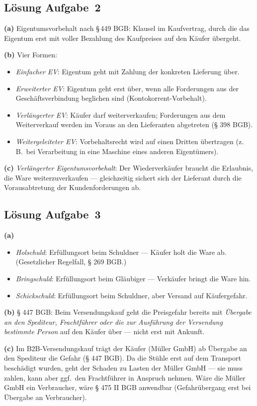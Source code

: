 \documentclass[11pt, a4paper]{article}
\begin{document}
\subsection*{Lösung Aufgabe~2}

\begin{loesung}
\textbf{(a)} Eigentumsvorbehalt nach §\,449 BGB: Klausel im Kaufvertrag, durch die
das Eigentum erst mit voller Bezahlung des Kaufpreises auf den Käufer übergeht.

\textbf{(b)} Vier Formen:
\begin{itemize}[itemsep=0pt]
  \item \emph{Einfacher EV}: Eigentum geht mit Zahlung der konkreten Lieferung über.
  \item \emph{Erweiterter EV}: Eigentum geht erst über, wenn alle Forderungen aus der Geschäftsverbindung beglichen sind (Kontokorrent-Vorbehalt).
  \item \emph{Verlängerter EV}: Käufer darf weiterverkaufen; Forderungen aus dem Weiterverkauf werden im Voraus an den Lieferanten abgetreten (§ 398 BGB).
  \item \emph{Weitergeleiteter EV}: Vorbehaltsrecht wird auf einen Dritten übertragen (z.\,B.\ bei Verarbeitung in eine Maschine eines anderen Eigentümers).
\end{itemize}

\textbf{(c)} \emph{Verlängerter Eigentumsvorbehalt}: Der Wiederverkäufer braucht die
Erlaubnis, die Ware weiterzuverkaufen --- gleichzeitig sichert sich der Lieferant
durch die Vorausabtretung der Kundenforderungen ab.
\end{loesung}

\subsection*{Lösung Aufgabe~3}

\begin{loesung}
\textbf{(a)}
\begin{itemize}[itemsep=0pt]
  \item \emph{Holschuld}: Erfüllungsort beim Schuldner --- Käufer holt die Ware ab. (Gesetzlicher Regelfall, § 269 BGB.)
  \item \emph{Bringschuld}: Erfüllungsort beim Gläubiger --- Verkäufer bringt die Ware hin.
  \item \emph{Schickschuld}: Erfüllungsort beim Schuldner, aber Versand auf Käufergefahr.
\end{itemize}

\textbf{(b)} § 447 BGB: Beim Versendungskauf geht die Preisgefahr bereits mit
\emph{Übergabe an den Spediteur, Frachtführer oder die zur Ausführung der Versendung
bestimmte Person} auf den Käufer über --- nicht erst mit Ankunft.

\textbf{(c)} Im B2B-Versendungskauf trägt der Käufer (Müller GmbH) ab Übergabe an den
Spediteur die Gefahr (§ 447 BGB). Da die Stühle erst auf dem Transport beschädigt
wurden, geht der Schaden zu Lasten der Müller GmbH --- sie muss zahlen, kann aber
ggf.\ den Frachtführer in Anspruch nehmen. Wäre die Müller GmbH ein Verbraucher,
wäre § 475 II BGB anwendbar (Gefahrübergang erst bei Übergabe an Verbraucher).
\end{loesung}
\end{document}
